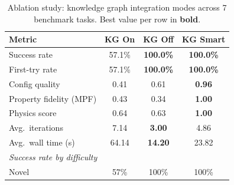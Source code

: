 \begin{table}[htbp]
\centering
\caption{Ablation study: knowledge graph integration modes across 7 benchmark tasks.  Best value per row in \textbf{bold}.}
\label{tab:ablation}
\begin{tabular}{lccc}
\toprule
Metric & KG On & KG Off & KG Smart \\
\midrule
  Success rate & 57.1\% & \textbf{100.0\%} & \textbf{100.0\%} \\
  First-try rate & 57.1\% & \textbf{100.0\%} & \textbf{100.0\%} \\
  Config quality & 0.41 & 0.61 & \textbf{0.96} \\
  Property fidelity (MPF) & 0.43 & 0.34 & \textbf{1.00} \\
  Physics score & 0.64 & 0.63 & \textbf{1.00} \\
  Avg.\ iterations & 7.14 & \textbf{3.00} & 4.86 \\
  Avg.\ wall time (s) & 64.14 & \textbf{14.20} & 23.82 \\
\midrule
\multicolumn{4}{l}{\textit{Success rate by difficulty}} \\
  \quad Novel & 57\% & 100\% & 100\% \\
\bottomrule
\end{tabular}
\end{table}